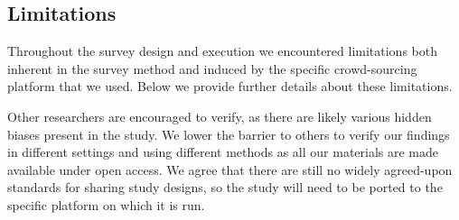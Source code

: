 \documentclass[twoside,letterpaper]{soups}
\begin{document}
\subsection{Limitations}

Throughout the survey design and execution we encountered limitations both inherent in the survey method and induced by the specific crowd-sourcing platform that we used. Below we provide further details about these limitations.

Other researchers are encouraged to verify, as there are likely various hidden biases present in the study. We lower the barrier to others to verify our findings in different settings and using different methods as all our materials are made available under open access. We agree that there are still no widely agreed-upon standards for sharing study designs, so the study will need to be ported to the specific platform on which it is run.











\end{document}
